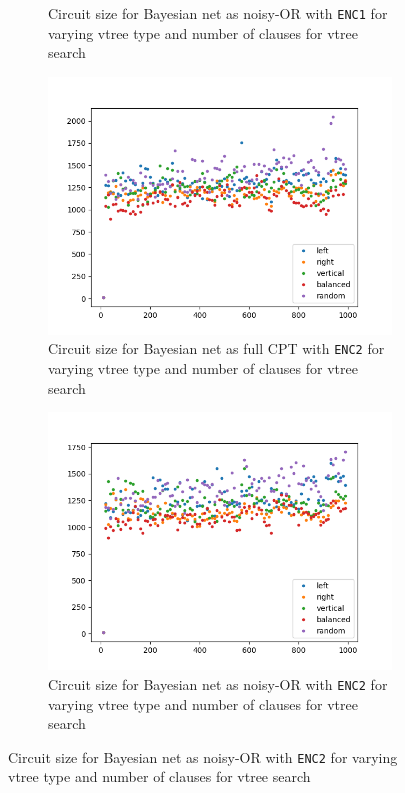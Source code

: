 \documentclass{article}
\begin{document}
\begin{figure}[h]
\begin{subfigure}[b]{0.4\linewidth}
    \caption{Circuit size for Bayesian net as noisy-OR with \texttt{ENC1} for varying vtree type and number of clauses for vtree search}
  \end{subfigure}
  \begin{subfigure}[b]{0.4\linewidth}
    \includegraphics[width=\linewidth]{images/enc2_full.png}
    \caption{Circuit size for Bayesian net as full CPT with \texttt{ENC2} for varying vtree type and number of clauses for vtree search}
  \end{subfigure}
    \begin{subfigure}[b]{0.4\linewidth}
    \includegraphics[width=\linewidth]{images/enc2_noisy.png}
    \caption{Circuit size for Bayesian net as noisy-OR with \texttt{ENC2} for varying vtree type and number of clauses for vtree search}
  \end{subfigure}
  \label{fig:circuits}
\end{figure}
\end{document}
